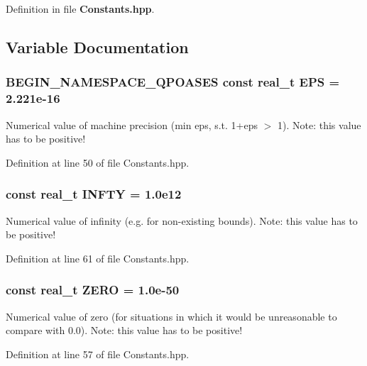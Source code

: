 Definition in file {\bf Constants.hpp}.



\subsection{Variable Documentation}
\subsubsection[{EPS}]{\setlength{\rightskip}{0pt plus 5cm}BEGIN\_\-NAMESPACE\_\-QPOASES const {\bf real\_\-t} {\bf EPS} = 2.221e-\/16}\label{Constants_8hpp_afc9ba76ddc87912abdb9b0e9029ea34e}
Numerical value of machine precision (min eps, s.t. 1+eps $>$ 1). Note: this value has to be positive! 

Definition at line 50 of file Constants.hpp.

\subsubsection[{INFTY}]{\setlength{\rightskip}{0pt plus 5cm}const {\bf real\_\-t} {\bf INFTY} = 1.0e12}\label{Constants_8hpp_a90ebbbce8b8f93a5785ca4d4d19d12a6}
Numerical value of infinity (e.g. for non-\/existing bounds). Note: this value has to be positive! 

Definition at line 61 of file Constants.hpp.

\subsubsection[{ZERO}]{\setlength{\rightskip}{0pt plus 5cm}const {\bf real\_\-t} {\bf ZERO} = 1.0e-\/50}\label{Constants_8hpp_ad819f2d51fdea4cd4ff6023e9e276e11}
Numerical value of zero (for situations in which it would be unreasonable to compare with 0.0). Note: this value has to be positive! 

Definition at line 57 of file Constants.hpp.

